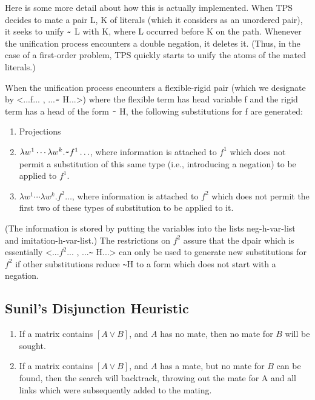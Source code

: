 Here is some more detail about how this is actually implemented.
When TPS decides to mate a pair {L, K} of literals (which it considers	
as an unordered pair), it seeks to unify $\verb+~+\;$L with K, where L 
occurred before K on the path. Whenever the unification process
encounters a double negation, it deletes it. (Thus, in the case of a
first-order problem, TPS quickly starts to unify the atoms of the mated
literals.)

When the unification process encounters a flexible-rigid pair
(which we designate by <...f... , ...$\verb+~+\;$H...>)
where the flexible term has head variable f and the rigid term has
a head of the form $\verb+~+\;$H, the following substitutions for f are
generated:

\begin{enumerate}
\item Projections

\item $\lambda w^{1}\cdots\lambda w^{k}. \verb+~+ f^{1} \ldots$, where information is attached
to $f^{1}$ which does not permit a substitution of this same type (i.e.,
introducing a negation) to be applied to $f^{1}$.

\item $\lambda w^{1}\cdots \lambda w^{k}. f^{2} \ldots$, where information is attached
to $f^{2}$ which does not permit the first two of these types of substitution
to be applied to it. 
\end{enumerate}

(The information is stored by putting the variables into the lists
neg-h-var-list and  imitation-h-var-list.)
The restrictions on $f^{2}$ assure that the dpair which is essentially
<...$f^{2}$... , ...\verb+~+ H...> can only be used to generate new substitutions
for $f^{2}$ if other substitutions reduce \verb+~+H to a form which does not
start with a negation. 

\subsection{Sunil's Disjunction Heuristic}

\begin{enumerate}
\item If a matrix contains $[A \lor B]$, and $A$ has no mate, then no
mate for $B$ will be sought.

\item If a matrix contains  $[A \lor B]$, and $A$ has a mate, but no
mate for $B$ can be found, then the search will backtrack,
throwing out the mate for A and all links which were subsequently
added to the mating.
\end{enumerate}


